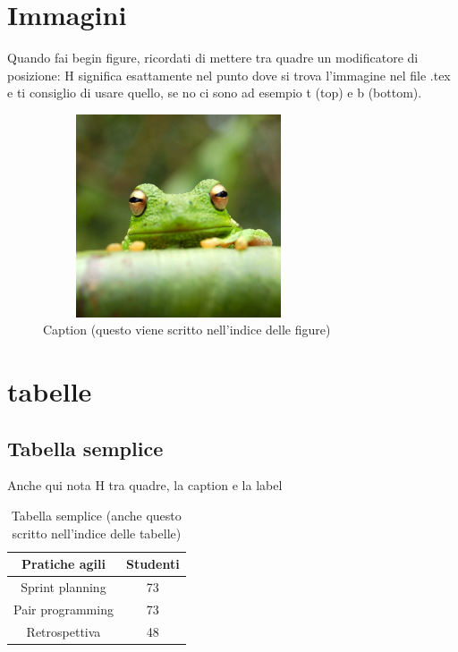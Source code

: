 \documentclass[12pt,a4paper,twoside]{book}
\begin{document}
\section{Immagini}
Quando fai begin figure, ricordati di mettere tra quadre un modificatore di posizione: H significa esattamente nel punto dove si trova l'immagine nel file .tex e ti consiglio di usare quello, se no ci sono ad esempio t (top) e b (bottom).

\begin{figure}[H]
    \centering
    \includegraphics[height = 6cm, width=8cm]{img/frog.jpg}
    \caption{Caption (questo viene scritto nell'indice delle figure)}
    \label{fig:frog}
\end{figure}

\section{tabelle}
\subsection{Tabella semplice}
Anche qui nota H tra quadre, la caption e la label

\begin{table}[H]
    \centering
    \begin{tabular}{|c|c|}
    \hline
        \textbf{Pratiche agili} & \textbf{Studenti}  \\ \hline
        Sprint planning & 73  \\ \hline
        Pair programming & 73  \\ \hline
        Retrospettiva & 48  \\ \hline
    \end{tabular}
    \caption{Tabella semplice (anche questo scritto nell'indice delle tabelle)}
    \label{tab:simple}
\end{table}
\end{document}
